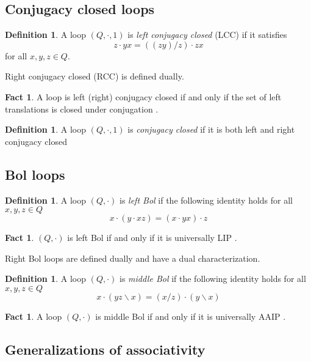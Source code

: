 \documentclass[12pt]{report}
\theoremstyle{definition}
\newtheorem{fct}[thm]{Fact}
\newtheorem{dfn}[thm]{Definition}
\newcommand{\ldv}{\backslash}       %
\newcommand{\rdv}{/}                %
\begin{document}
\subsection{Conjugacy closed loops}

\begin{dfn}
  A loop $(Q, \cdot, 1)$ is \emph{left conjugacy closed} (LCC) if it satisfies
  \[z\cdot yx = ((zy)\rdv z)\cdot zx\]
  for all $x, y, z\in Q$.
\end{dfn}

Right conjugacy closed (RCC) is defined dually.

\begin{fct}
  A loop is left (right) conjugacy closed if and only if the set of left translations is closed under conjugation \cite{PACC}.
\end{fct}

\begin{dfn}
  A loop $(Q, \cdot, 1)$ is \emph{conjugacy closed} if it is both left and right conjugacy closed
\end{dfn}

\subsection{Bol loops}

\begin{dfn}
  A loop $(Q, \cdot)$ is \emph{left Bol} if the following identity holds for all $x, y, z\in Q$
  \[x\cdot (y\cdot xz) = (x\cdot yx)\cdot z\]
\end{dfn}

\begin{fct}
  $(Q, \cdot)$ is left Bol if and only if it is universally LIP \cite{SUF}.
\end{fct}

Right Bol loops are defined dually and have a dual characterization.

\begin{dfn}
  A loop $(Q, \cdot)$ is \emph{middle Bol} if the following identity holds for all $x, y, z\in Q$
  \[x\cdot (yz\ldv x) = (x\rdv z)\cdot (y\ldv x)\]
\end{dfn}

\begin{fct}
  A loop $(Q, \cdot)$ is middle Bol if and only if it is universally AAIP \cite{SUF}.
\end{fct}

\subsection{Generalizations of associativity}
\end{document}
